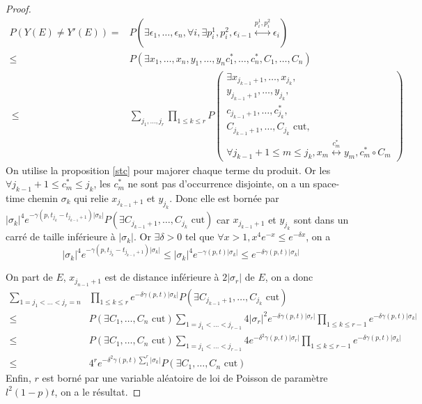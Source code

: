 \documentclass[titlepage,a4paper,11pt]{article}
\newcounter{prop}
\newcommand{\connect}{\leftrightarrow}
\begin{document}
\begin{proof}
\begin{align*}
P(Y(E)\neq Y'(E)) =& P(\exists \epsilon_1,\dots,\epsilon_n, \forall i, \exists p_i^1,p_i^2, \epsilon_{i-1}\overset{p_i^1,p_i^2}{\connect}\epsilon_i) \\
 \leqslant &P(\exists x_1,\dots,x_n,y_1,\dots,y_n c^*_1,\dots,c^*_n,C_1,\dots,C_n) \\\
 \leqslant &\sum_{j_1,\dots,j_r}\prod_{1\leqslant k \leqslant r} P\left(\begin{array}{c}
 \exists x_{j_{k-1}+1},\dots,x_{j_k},\\
 y_{j_{k-1}+1},\dots,y_{j_k},\\
 c_{j_{k-1}+1},\dots,c^*_{j_k},\\
 C_{j_{k-1}+1},\dots,C_{j_k} \text{ cut},\\
 \forall j_{k-1}+1 \leqslant m \leqslant j_k, x_m\overset{c^*_m}{\connect} y_m, 
 c^*_m\circ C_m
 \end{array}
 \right)
\end{align*}
On utilise la proposition \ref{stc} pour majorer chaque terme du produit. Or les $\forall j_{k-1}+1 \leqslant c^*_m \leqslant j_k$, les $c^*_m$ ne sont pas d'occurrence disjointe, on a un space-time chemin $\sigma_k$ qui relie $x_{j_{k-1}+1}$ et $y_{j_k}$. Donc elle est bornée par $ \displaystyle |\sigma_k|^4 e^{-\gamma(p,t_{j_k}-t_{j_{k-1}+1})|\sigma_k|} P(\exists C_{j_{k-1}+1},\dots,C_{j_k} \text{ cut})$ car $x_{j_{k-1}+1}$ et $y_{j_k}$ sont dans un carré de taille inférieure à $ |\sigma_k|$. Or $\exists \delta>0$ tel que $\forall x>1, x^4e^{-x} \leqslant e^{-\delta x}$, on a 
$$|\sigma_k|^4 e^{-\gamma(p,t_{j_k}-t_{j_{k-1}+1})|\sigma_k|} \leqslant |\sigma_k|^4 e^{-\gamma(p,t)|\sigma_k|} \leqslant e^{-\delta\gamma(p,t)|\sigma_k|}$$

On part de $E$, $x_{j_{n-1}+1}$ est de distance inférieure à $2|\sigma_r|$ de $E$, on a donc 
\begin{align*}\sum_{1=j_1<\dots < j_r = n} &\prod_{1\leqslant k \leqslant r} e^{-\delta \gamma(p,t)|\sigma_k|} P(\exists C_{j_{k-1}+1},\dots,C_{j_k} \text{ cut}) \\
\leqslant & P(\exists C_1,\dots,C_n \text{ cut})\sum_{1=j_1<\dots < j_{r-1}} 4|\sigma_r|^2e^{-\delta \gamma(p,t)|\sigma_r|}\prod_{1\leqslant k \leqslant r-1}e^{-\delta \gamma(p,t)|\sigma_k|} \\
\leqslant & P(\exists C_1,\dots,C_n \text{ cut})\sum_{1=j_1<\dots < j_{r-1}} 4e^{-\delta^2 \gamma(p,t)|\sigma_r|}\prod_{1\leqslant k \leqslant r-1}e^{-\delta \gamma(p,t)|\sigma_k|} \\
\leqslant & 4^r e^{-\delta^2 \gamma(p,t)\sum_1^r|\sigma_k|}P(\exists C_1,\dots,C_n \text{ cut})
\end{align*}
Enfin, $r$ est borné par une variable aléatoire de loi de Poisson de paramètre $l^2 (1-p) t$, on a le résultat.
\end{proof}
\end{document}
